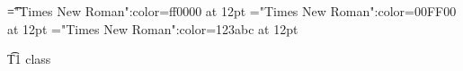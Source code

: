 \documentclass[a4paper]{article}
\begin{document}
 
\pagestyle{plain} 
\font\t="Times New Roman":color=ff0000 at 12pt
\font\zt="Times New Roman":color=00FF00 at 12pt
\font\wzt="Times New Roman":color=123abc at 12pt

\pagestyle{fancy} 

\t{T1 class }


\end{document}
